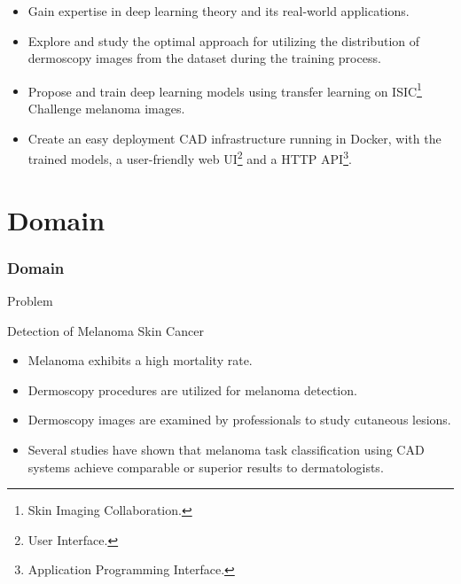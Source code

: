\documentclass[dvipsnames,mathserif]{beamer}
\begin{document}
{\begin{frame}
      \footnotesize
      \begin{itemize}
        \item Gain expertise in deep learning theory and its real-world
          applications.
        \item Explore and study the optimal approach for utilizing the distribution
          of dermoscopy images from the dataset during the training process.
        \item Propose and train deep learning models using transfer learning on ISIC\footnote{Skin Imaging Collaboration.}
          Challenge melanoma images.
        \item Create an easy deployment CAD infrastructure running in Docker,
          with the trained models, a user-friendly web UI\footnote{User
          Interface.} and a HTTP API\footnote{Application Programming Interface.}.
      \end{itemize}


    \end{frame}

    \section{Domain}

    \begin{frame}
      \frametitle{Domain}
    \end{frame}

    \begin{frame}
      \begin{center}
        \Huge Problem
      \end{center}
    \end{frame}


    \begin{frame}
      \large Detection of Melanoma Skin Cancer
      \vspace{0.25cm}

      \footnotesize
      \begin{itemize}
        \item Melanoma exhibits a high mortality rate.
        \item Dermoscopy procedures are utilized for melanoma detection.
        \item Dermoscopy images are examined by professionals to study cutaneous lesions.
        \item Several studies have shown that melanoma task classification
          using CAD systems achieve comparable or superior results to
          dermatologists.
      \end{itemize}



\end{frame}}
\end{document}
